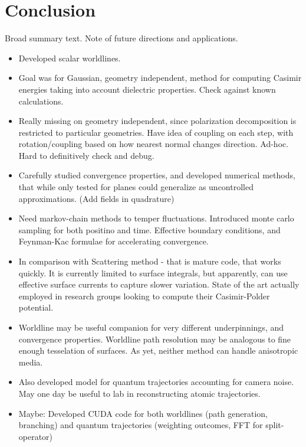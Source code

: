 \chapter{Conclusion}

Broad summary text.  Note of future directions and applications.

\begin{itemize}
  \item Developed scalar worldlines.  
  \item Goal was for Gaussian, geometry independent, method for computing Casimir energies taking
    into account dielectric properties.
    Check against known calculations.
    
  \item Really missing on geometry independent, since polarization decomposition is restricted to
    particular geometries.  Have idea of coupling on each step, with rotation/coupling based on how
    nearest normal changes direction.
    Ad-hoc.  Hard to definitively check and debug.
  \item Carefully studied convergence properties, and developed numerical methods, that while 
    only tested for planes could generalize as uncontrolled approximations.  (Add fields in quadrature)
  \item Need markov-chain methods to temper fluctuations.  Introduced monte carlo sampling for both 
    positino and time.  
    Effective boundary conditions, and Feynman-Kac formulae for accelerating convergence.
  \item In comparison with Scattering method - that is mature code, that works quickly.
    It is currently limited to surface integrals, but apparently, can use effective surface currents
    to capture slower variation.  State of the art actually employed in research groups looking to 
    compute their Casimir-Polder potential.
  \item Worldline may be useful companion for very different underpinnings, and convergence properties.
    Worldline path resolution may be analogous to fine enough tesselation of surfaces.  
    As yet, neither method can handle anisotropic media.  
    
  \item Also developed model for quantum trajectories accounting for camera noise.  
    May one day be useful to lab in reconstructing atomic trajectories.

  \item Maybe: 
    Developed CUDA code for both worldlines (path generation, branching) and quantum trajectories
    (weighting outcomes, FFT for split-operator)
\end{itemize}



